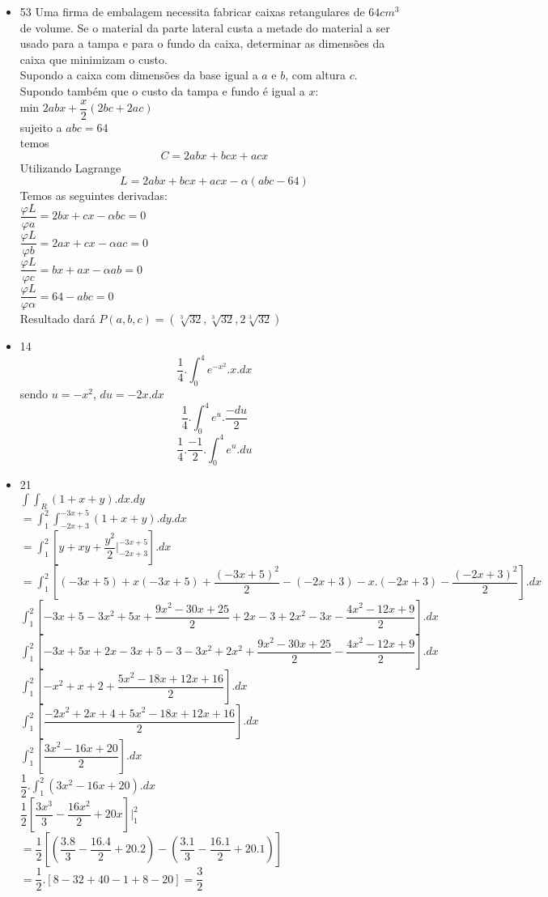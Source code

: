\documentclass{article}
\begin{document}
\begin{itemize}
	\item 53 Uma firma de embalagem necessita fabricar caixas retangulares de $64 cm^3$ de volume. Se o material da parte lateral custa a metade do material a ser usado para a tampa e para o fundo da caixa, determinar as dimensões da caixa que minimizam o custo.\\
	Supondo a caixa com dimensões da base igual a $a$ e $b$, com altura $c$.\\
	Supondo também  que o custo da tampa e fundo é igual a $x$:\\
	min $2abx+\dfrac{x}{2}(2bc + 2ac)$\\
	sujeito a $abc = 64$\\
	temos
	$$C = 2abx + bcx+acx$$
	Utilizando Lagrange
	$$L = 2abx+bcx+acx - \alpha(abc-64)$$
	Temos as seguintes derivadas:\\
	$\dfrac{\varphi L}{\varphi a} = 2bx+cx-\alpha bc =0$\\
	$\dfrac{\varphi L}{\varphi b} = 2ax + cx- \alpha ac =0$\\
	$\dfrac{\varphi L}{\varphi c} = bx+ax-\alpha ab =0$\\
	$\dfrac{\varphi L}{\varphi \alpha} = 64 - abc =0$\\
	Resultado dará $P(a,b,c) = (\sqrt[3]{32},\sqrt[3]{32},2\sqrt[3]{32})$
	
	\item 14
	$$\dfrac{1}{4}.\int_0^4 e^{-x^2}.x.dx$$
	sendo $u =-x^2$, $du = -2x.dx$
	$$\dfrac{1}{4}.\int_0^4 e^u.\dfrac{-du}{2}$$
	$$\dfrac{1}{4}.\dfrac{-1}{2}.\int_0^4 e^u.du$$
	
	\item 21\\
	
	$\int \int_R (1+x+y).dx.dy$\\
	$= \int_1^2 \int_{-2x+3}^{-3x+5} (1+x+y).dy.dx$\\
	$= \int_1^2[y+xy+\dfrac{y^2}{2}|_{-2x+3}^{-3x+5}].dx$\\
	$=\int_1^2[(-3x+5)+x(-3x+5)+\dfrac{(-3x+5)^2}{2}-(-2x+3)-x.(-2x+3)-\dfrac{(-2x+3)^2}{2}].dx$\\
	$\int_1^2[-3x+5-3x^2+5x+\dfrac{9x^2-30x+25}{2}+2x-3+2x^2-3x-\dfrac{4x^2-12x+9}{2}].dx$\\
	$\int_1^2[-3x+5x+2x-3x+5-3-3x^2+2x^2+\dfrac{9x^2-30x+25}{2}-\dfrac{4x^2-12x+9}{2}].dx$\\
	$\int_1^2[-x^2+x+2+\dfrac{5x^2-18x+12x+16}{2}].dx$\\
	$\int_1^2[\dfrac{-2x^2+2x+4+5x^2-18x+12x+16}{2}].dx$\\
	$\int_1^2[\dfrac{3x^2-16x+20}{2}].dx$\\
	$\dfrac{1}{2}.\int_1^2(3x^2-16x+20).dx$\\
	$\dfrac{1}{2}[\dfrac{3x^3}{3}-\dfrac{16x^2}{2}+20x]|_1^2$\\
	$=\dfrac{1}{2}[(\dfrac{3.8}{3}-\dfrac{16.4}{2}+20.2)-(\dfrac{3.1}{3}-\dfrac{16.1}{2}+20.1)]$\\
	$=\dfrac{1}{2}.[8-32+40-1+8-20]=\dfrac{3}{2}$
\end{itemize}
\end{document}
